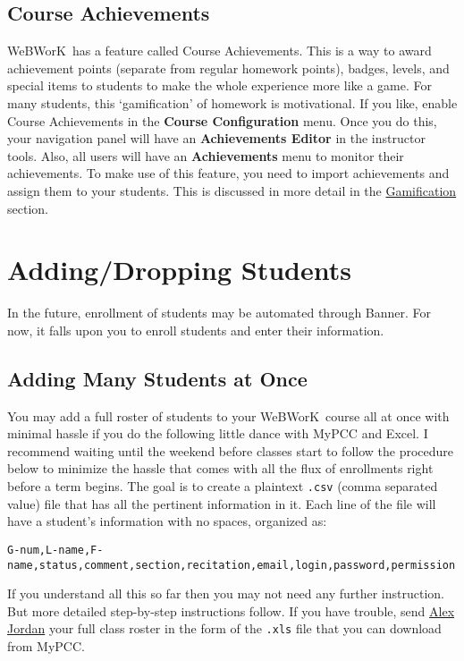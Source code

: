 \documentclass[12pt]{article}
\newcommand{\menu}[1]{\textbf{#1}}
\newcommand{\WW}{WeBWorK}
\begin{document}
\subsection{Course Achievements}

\WW\ has a feature called Course Achievements. This is a way to award achievement points (separate from regular homework points), badges, levels, and special items to students to make the whole experience more like a game. For many students, this `gamification' of homework is motivational. If you like, enable Course Achievements in the \menu{Course Configuration} menu. Once you do this, your navigation panel will have an \menu{Achievements Editor} in the instructor tools. Also, all users will have an \menu{Achievements} menu to monitor their achievements. To make use of this feature, you need to import achievements and assign them to your students. This is discussed in more detail in the \hyperref[gamification]{Gamification} section. 

\section{Adding/Dropping Students}
In the future, enrollment of students may be automated through Banner. For now, it falls upon you to enroll students and enter their information. 

\subsection{Adding Many Students at Once}
You may add a full roster of students to your \WW\ course all at once with minimal hassle if you do the following little dance with MyPCC and Excel.  I recommend waiting until the weekend before classes start to follow the procedure below to minimize the hassle that comes with all the flux of enrollments right before a term begins. The goal is to create a plaintext \texttt{.csv} (comma separated value) file that has all the pertinent information in it.  Each line of the file will have a student's information with no spaces, organized as:\\

\small
\centerline{\texttt{G-num,L-name,F-name,status,comment,section,recitation,email,login,password,permission}}
\normalsize
\vspace{1pc}

If you understand all this so far then you may not need any further instruction. But more detailed step-by-step instructions follow. If you have trouble, send \href{mailto:alex.jordan@pcc.edu}{Alex Jordan} your full class roster in the form of the \texttt{.xls} file that you can download from MyPCC.
\end{document}
